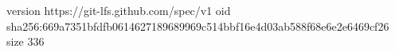 version https://git-lfs.github.com/spec/v1
oid sha256:669a7351bfdfb0614627189689969c514bbf16e4d03ab588f68e6e2e6469cf26
size 336
